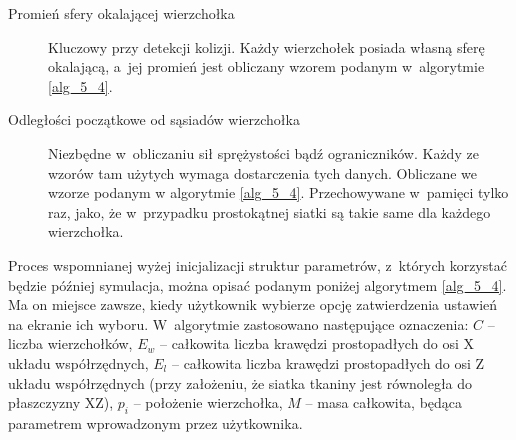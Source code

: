 \begin{description}
			\item[Promień sfery okalającej wierzchołka] Kluczowy przy detekcji kolizji. Każdy wierzchołek posiada własną sferę okalającą, a~jej promień jest obliczany wzorem podanym w~algorytmie \ref{alg_5_4}.
			
			\item[Odległości początkowe od sąsiadów wierzchołka] Niezbędne w~obliczaniu sił sprężystości bądź ograniczników. Każdy ze wzorów tam użytych wymaga dostarczenia tych danych. Obliczane we wzorze podanym w algorytmie \ref{alg_5_4}. Przechowywane w~pamięci tylko raz, jako, że w~przypadku prostokątnej siatki są takie same dla każdego wierzchołka.
			
		\end{description}
		
		Proces wspomnianej wyżej inicjalizacji struktur parametrów, z~których korzystać będzie później symulacja, można opisać podanym poniżej algorytmem \ref{alg_5_4}. Ma on miejsce zawsze, kiedy użytkownik wybierze opcję zatwierdzenia ustawień na ekranie ich wyboru. W~algorytmie zastosowano następujące oznaczenia: \(C\) -- liczba wierzchołków, \(E_{w}\) -- całkowita liczba krawędzi prostopadłych do osi X układu współrzędnych, \(E_{l}\) -- całkowita liczba krawędzi prostopadłych do osi Z układu współrzędnych (przy założeniu, że siatka tkaniny jest równoległa do płaszczyzny XZ), \(p_{i}\) -- położenie wierzchołka, \(M\) -- masa całkowita, będąca parametrem wprowadzonym przez użytkownika.
		
